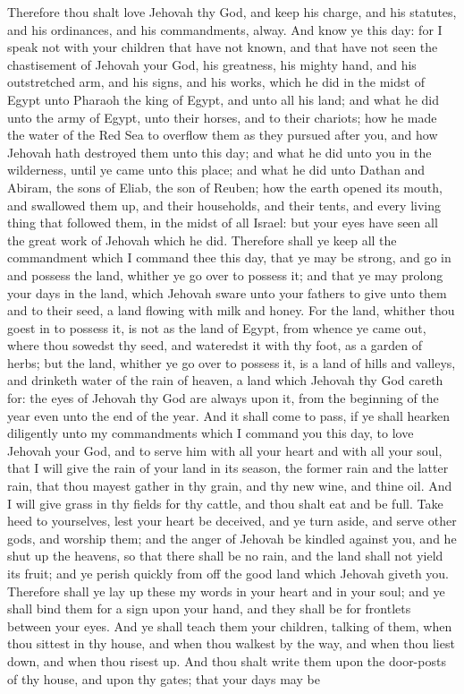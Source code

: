 Therefore thou shalt love Jehovah thy God, and keep his charge, and his statutes, and his ordinances, and his commandments, alway. And know ye this day: for I speak not with your children that have not known, and that have not seen the chastisement of Jehovah your God, his greatness, his mighty hand, and his outstretched arm, and his signs, and his works, which he did in the midst of Egypt unto Pharaoh the king of Egypt, and unto all his land; and what he did unto the army of Egypt, unto their horses, and to their chariots; how he made the water of the Red Sea to overflow them as they pursued after you, and how Jehovah hath destroyed them unto this day; and what he did unto you in the wilderness, until ye came unto this place; and what he did unto Dathan and Abiram, the sons of Eliab, the son of Reuben; how the earth opened its mouth, and swallowed them up, and their households, and their tents, and every living thing that followed them, in the midst of all Israel: but your eyes have seen all the great work of Jehovah which he did.  Therefore shall ye keep all the commandment which I command thee this day, that ye may be strong, and go in and possess the land, whither ye go over to possess it; and that ye may prolong your days in the land, which Jehovah sware unto your fathers to give unto them and to their seed, a land flowing with milk and honey. For the land, whither thou goest in to possess it, is not as the land of Egypt, from whence ye came out, where thou sowedst thy seed, and wateredst it with thy foot, as a garden of herbs; but the land, whither ye go over to possess it, is a land of hills and valleys, and drinketh water of the rain of heaven, a land which Jehovah thy God careth for: the eyes of Jehovah thy God are always upon it, from the beginning of the year even unto the end of the year.  And it shall come to pass, if ye shall hearken diligently unto my commandments which I command you this day, to love Jehovah your God, and to serve him with all your heart and with all your soul, that I will give the rain of your land in its season, the former rain and the latter rain, that thou mayest gather in thy grain, and thy new wine, and thine oil. And I will give grass in thy fields for thy cattle, and thou shalt eat and be full. Take heed to yourselves, lest your heart be deceived, and ye turn aside, and serve other gods, and worship them; and the anger of Jehovah be kindled against you, and he shut up the heavens, so that there shall be no rain, and the land shall not yield its fruit; and ye perish quickly from off the good land which Jehovah giveth you.  Therefore shall ye lay up these my words in your heart and in your soul; and ye shall bind them for a sign upon your hand, and they shall be for frontlets between your eyes. And ye shall teach them your children, talking of them, when thou sittest in thy house, and when thou walkest by the way, and when thou liest down, and when thou risest up. And thou shalt write them upon the door-posts of thy house, and upon thy gates; that your days may be 